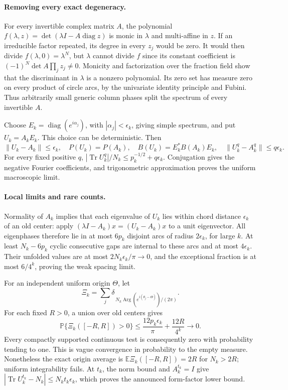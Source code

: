 \paragraph{Removing every exact degeneracy.}
For every invertible complex matrix \(A\), the polynomial
\(f(\lambda,z)=\det(\lambda I-A\operatorname{diag}z)\) is monic in
\(\lambda\) and multi-affine in \(z\).  If an irreducible factor repeated,
its degree in every \(z_j\) would be zero.  It would then divide
\(f(\lambda,0)=\lambda^N\), but \(\lambda\) cannot divide \(f\) since
its constant coefficient is
\((-1)^N\det A\prod_jz_j\ne0\).
Monicity and factorization over the fraction field show that the
discriminant in \(\lambda\) is a nonzero polynomial.  Its zero set
has measure zero on every product of circle arcs, by the univariate
identity principle and Fubini.  Thus arbitrarily small generic column
phases split the spectrum of every invertible \(A\).

Choose \(E_k=\operatorname{diag}(e^{i\alpha_j})\), with
\(|\alpha_j|<\epsilon_k\), giving simple spectrum, and put \(U_k=A_kE_k\).
This choice can be deterministic.  Then
\[
\|U_k-A_k\|\le\epsilon_k,\quad P(U_k)=P(A_k),\quad
B(U_k)=E_k^*B(A_k)E_k,\quad
\|U_k^q-A_k^q\|\le q\epsilon_k .
\]
For every fixed positive \(q\),
\(|\operatorname{Tr}U_k^q|/N_k\le p_k^{-1/2}+q\epsilon_k\).
Conjugation gives the negative Fourier coefficients, and trigonometric
approximation proves the uniform macroscopic limit.

\paragraph{Local limits and rare counts.}
Normality of \(A_k\) implies that each eigenvalue of \(U_k\) lies within
chord distance \(\epsilon_k\) of an old center: apply
\((\lambda I-A_k)x=(U_k-A_k)x\) to a unit eigenvector.
All eigenphases therefore lie in at most \(6p_k\) disjoint arcs of
radius \(2\epsilon_k\), for large \(k\).  At least \(N_k-6p_k\)
cyclic consecutive gaps are internal to these arcs and at most
\(4\epsilon_k\).  Their unfolded values are at most
\(2N_k\epsilon_k/\pi\to0\), and the exceptional fraction is at most
\(6/4^k\), proving the weak spacing limit.

For an independent uniform origin \(\Theta\), let
\[
\Xi_k=\sum_j\delta_{\,N_k\operatorname{Arg}
             (e^{i(\theta_j-\Theta)})/(2\pi)} .
\]
For each fixed \(R>0\), a union over old centers gives
\[
\mathbb P\{\Xi_k([-R,R])>0\}
 \le \frac{12p_k\epsilon_k}{\pi}+\frac{12R}{4^k}\longrightarrow0 .
\]
Every compactly supported continuous test is consequently zero with
probability tending to one.  This is vague convergence in probability
to the empty measure.  Nonetheless the exact origin average is
\(\mathbb E\Xi_k([-R,R])=2R\) for \(N_k>2R\);
uniform integrability fails.  At \(t_k\), the norm bound and
\(A_k^{t_k}=I\) give
\(|\operatorname{Tr}U_k^{t_k}-N_k|\le N_kt_k\epsilon_k\),
which proves the announced form-factor lower bound.


